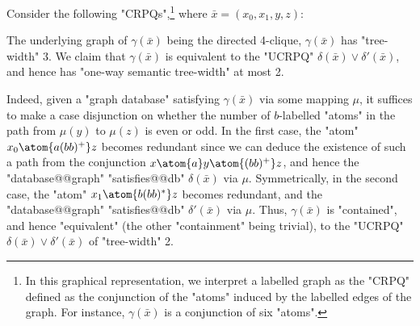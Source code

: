 \begin{example}
    \AP\label{ex:CRPQ-tw3-stw2}
    Consider the following "CRPQs",\footnote{In this graphical representation,
	we interpret a labelled graph as the "CRPQ" defined as
	the conjunction of the "atoms" induced by the labelled edges of the graph.
	For instance, $\gamma(\bar x)$ is a conjunction of six "atoms".}
    where $\bar x = (x_0,x_1,y,z)$:\leavevmode
    \begin{center}
        \small
    \end{center}
    \noindent
    The underlying graph of $\gamma(\bar x)$ being the directed 4-clique, $\gamma 
    (\bar x)$ has "tree-width" 3. We claim that $\gamma(\bar x)$ is equivalent to the "UCRPQ"
    $\delta(\bar x) \lor \delta'(\bar x)$, and hence has "one-way semantic tree-width" at most 2.

    Indeed, given a "graph database" satisfying $\gamma(\bar x)$ via some mapping $\mu$, 
    it suffices to make a case disjunction on whether the number of $b$-labelled "atoms"
    in the path from
    $\mu(y)$ to $\mu(z)$ is even or odd. In the first case, the "atom" $x_0\atom{a(bb)^+} z$ becomes
    redundant since we can deduce the existence of such a path from the conjunction
    $x \atom{a} y \atom{(bb)^+} z$, and hence the "database@@graph" "satisfies@@db" $\delta(\bar x)$ via $\mu$.
    Symmetrically, in the second case, the "atom" $x_1 \atom{b(bb)^*} z$ becomes redundant,
    and the "database@@graph" "satisfies@@db" $\delta'(\bar x)$ via $\mu$. 
    Thus, $\gamma(\bar x)$
    is "contained", and hence "equivalent" (the other "containment" being trivial), to
    the "UCRPQ" $\delta(\bar x) \lor \delta'(\bar x)$ of "tree-width" 2.
\end{example}

